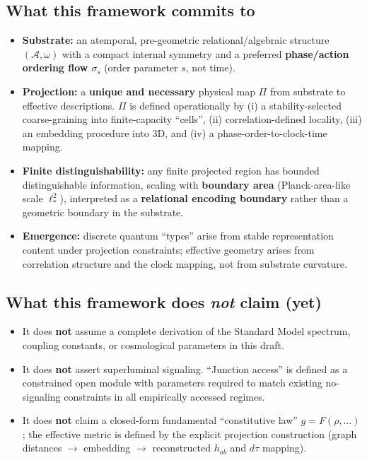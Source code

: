 \documentclass[reprint, amsmath, amssymb, aps, prd]{revtex4-2}
\begin{document}
\subsection{What this framework commits to}
\begin{itemize}
    \item \textbf{Substrate:} an atemporal, pre-geometric relational/algebraic structure $(\mathcal{A}, \omega)$ with a compact internal symmetry and a preferred \textbf{phase/action ordering flow} $\sigma_s$ (order parameter $s$, not time).
    \item \textbf{Projection:} a \textbf{unique and necessary} physical map $\Pi$ from substrate to effective descriptions. $\Pi$ is defined operationally by (i) a stability-selected coarse-graining into finite-capacity ``cells'', (ii) correlation-defined locality, (iii) an embedding procedure into 3D, and (iv) a phase-order-to-clock-time mapping.
    \item \textbf{Finite distinguishability:} any finite projected region has bounded distinguishable information, scaling with \textbf{boundary area} (Planck-area-like scale $\ell_*^2$), interpreted as a \textbf{relational encoding boundary} rather than a geometric boundary in the substrate.
    \item \textbf{Emergence:} discrete quantum ``types'' arise from stable representation content under projection constraints; effective geometry arises from correlation structure and the clock mapping, not from substrate curvature.
\end{itemize}

\subsection{What this framework does \textit{not} claim (yet)}
\begin{itemize}
    \item It does \textbf{not} assume a complete derivation of the Standard Model spectrum, coupling constants, or cosmological parameters in this draft.
    \item It does \textbf{not} assert superluminal signaling. ``Junction access'' is defined as a constrained open module with parameters required to match existing no-signaling constraints in all empirically accessed regimes.
    \item It does \textbf{not} claim a closed-form fundamental ``constitutive law'' $g = F(\rho, \ldots)$; the effective metric is defined by the explicit projection construction (graph distances $\rightarrow$ embedding $\rightarrow$ reconstructed $h_{ab}$ and $d\tau$ mapping).
\end{itemize}
\end{document}
